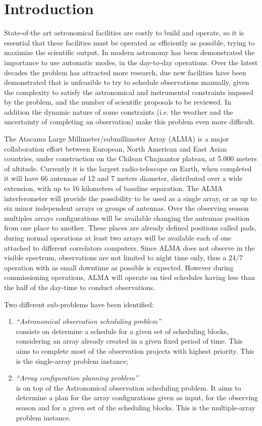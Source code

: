 \chapter{Introduction}

State-of-the art astronomical facilities are costly to build and operate, so it is essential that these facilities 
must be operated as efficiently as possible, trying to maximize the scientific output. In modern astronomy has been
demonstrated the importance to use automatic modes, in the day-to-day operations.
Over the latest decades the problem has attracted more research, due new facilities have been
demonstrated that is unfeasible to try to schedule observations manually, given the complexity to satisfy
the astronomical and instrumental constraints imposed by the problem, and the number of scientific
proposals to be reviewed. In addition the dynamic nature of some constraints (i.e. the weather and
the uncertainty of completing an observation) make this problem even more difficult.

The Atacama Large Millimeter/submillimeter Array (ALMA) is a major collaboration effort between
European, North American and East Asian countries, under construction on the Chilean Chajnantor
plateau, at 5.000 meters of altitude. Currently it is the largest radio-telescope on Earth, when completed it
will have 66 antennas of 12 and 7 meters diameter, distributed over a wide extension, with up to 16 kilometers
of baseline separation. The ALMA interferometer will provide the possibility to be used as a single
array, or as up to six minor independent arrays or groups of antennas. Over the observing season
multiples arrays configurations will be available changing the antennas position from one place to
another. These places are already defined positions called pads, during normal operations at least two
arrays will be available each of one attached to different correlators computers. Since ALMA does not
observe in the visible spectrum, observations are not limited to night time only, thus a 24/7 operation
with as small downtime as possible is expected. However during commissioning operations, ALMA will operate on tied schedules having less than the half of the day-time to conduct observations.

Two different sub-problems have been identified: 
\begin{enumerate}
\item \textit{``Astronomical observation scheduling problem''}  \hfill \\
consists on determine a schedule for a given set of scheduling blocks, considering an array already created in a given fixed
period of time. This aims to complete most of the observation projects with highest priority. This is the single-array problem instance;

\item \textit{``Array configuration planning problem''} \hfill \\
is on top of the Astronomical observation scheduling problem. It aims to determine a plan for the array configurations given as input,
for the observing season and for a given set of the scheduling blocks. This is the multiple-array problem instance.
\end{enumerate}

